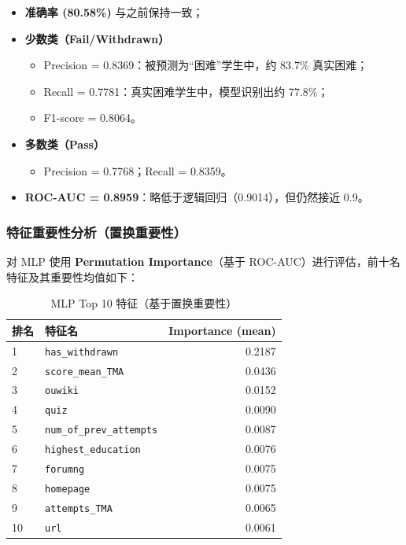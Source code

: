 \documentclass{SYSUReport}
\begin{document}
\begin{itemize}
  \item \textbf{准确率 (80.58\%)} 与之前保持一致；  
  \item \textbf{少数类（Fail/Withdrawn）}  
    \begin{itemize}
      \item Precision = 0.8369：被预测为“困难”学生中，约 83.7\% 真实困难；  
      \item Recall = 0.7781：真实困难学生中，模型识别出约 77.8\%；  
      \item F1-score = 0.8064。  
    \end{itemize}
  \item \textbf{多数类（Pass）}  
    \begin{itemize}
      \item Precision = 0.7768；Recall = 0.8359。  
    \end{itemize}
  \item \textbf{ROC-AUC = 0.8959}：略低于逻辑回归（0.9014），但仍然接近 0.9。
\end{itemize}

\subsubsection{特征重要性分析（置换重要性）}
对 MLP 使用 \textbf{Permutation Importance}（基于 ROC-AUC）进行评估，前十名特征及其重要性均值如下：

\begin{table}[htbp]
\centering
\begin{tabular}{lp{6cm}r}
\hline
排名 & 特征名 & Importance (mean) \\
\hline
1  & \texttt{has\_withdrawn}         & 0.2187 \\
2  & \texttt{score\_mean\_TMA}        & 0.0436 \\
3  & \texttt{ouwiki}                 & 0.0152 \\
4  & \texttt{quiz}                   & 0.0090 \\
5  & \texttt{num\_of\_prev\_attempts}& 0.0087 \\
6  & \texttt{highest\_education}     & 0.0076 \\
7  & \texttt{forumng}                & 0.0075 \\
8  & \texttt{homepage}               & 0.0075 \\
9  & \texttt{attempts\_TMA}          & 0.0065 \\
10 & \texttt{url}                    & 0.0061 \\
\hline
\end{tabular}
\caption{MLP Top 10 特征（基于置换重要性）}
\end{table}
\end{document}
